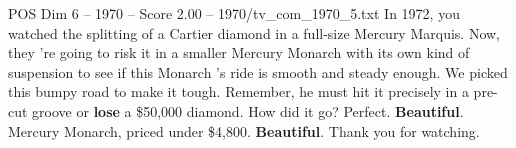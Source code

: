 \begin{textsample}{POS Dim 6 – 1970 – Score 2.00 – 1970/tv\_com\_1970\_5.txt}  \label{ex:f6_pos_031}
In 1972, you watched the splitting of a Cartier diamond in a full-size Mercury Marquis.
Now, they 're going to risk it in a smaller Mercury Monarch with its own kind of suspension to see if this Monarch 's ride is smooth and steady enough.
We picked this bumpy road to make it tough.
Remember, he must hit it precisely in a pre-cut groove or \textbf{lose} a \$50,000 diamond.
How did it go?
Perfect. \textbf{Beautiful}.
Mercury Monarch, priced under \$4,800. \textbf{Beautiful}.
Thank you for watching.

\end{textsample}
